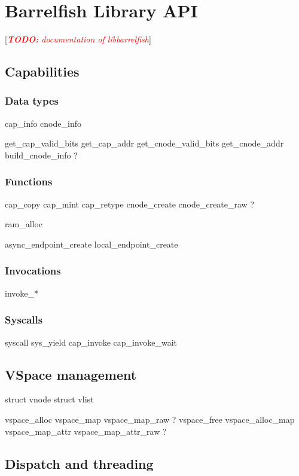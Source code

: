 \documentclass{scrreprt}
\newcommand{\note}[1]{ [\textcolor{red}{\emph{#1}}]}
\newcommand{\todo}[1]{\note{\textbf{TODO:} #1}}
\begin{document}
  \chapter{Barrelfish Library API}

  \todo{documentation of libbarrelfish}

  \section{Capabilities}
  
  \subsection{Data types}
  
  cap\_info
  cnode\_info
  
  get\_cap\_valid\_bits
  get\_cap\_addr
  get\_cnode\_valid\_bits
  get\_cnode\_addr
  build\_cnode\_info ?
  
  \subsection{Functions}

  cap\_copy
  cap\_mint
  cap\_retype
  cnode\_create
  cnode\_create\_raw ?
  
  ram\_alloc
  
  async\_endpoint\_create
  local\_endpoint\_create

  \subsection{Invocations}
  invoke\_*
  
  \subsection{Syscalls}
  
  syscall
  sys\_yield
  cap\_invoke
  cap\_invoke\_wait
  
  
  \section{VSpace management}
  
  struct vnode
  struct vlist
  
  vspace\_alloc
  vspace\_map
  vspace\_map\_raw ?
  vspace\_free
  vspace\_alloc\_map
  vspace\_map\_attr
  vspace\_map\_attr\_raw ?

  \section{Dispatch and threading}
\end{document}
